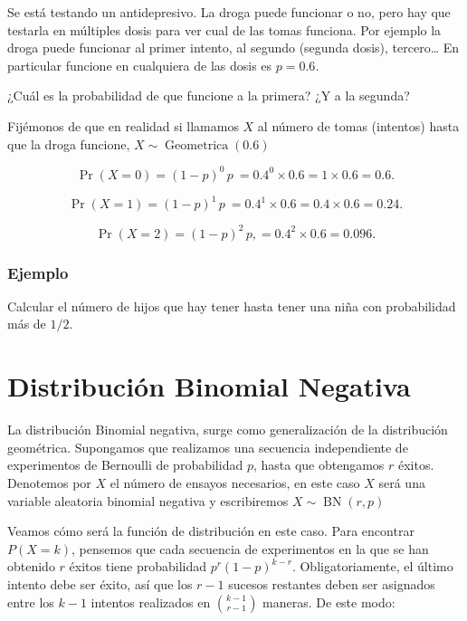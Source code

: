 \documentclass[]{book}
\theoremstyle{plain}
\theoremstyle{definition}
\theoremstyle{definition} %
\begin{document}
Se está testando un antidepresivo. La droga puede funcionar o no, pero
hay que testarla en múltiples dosis para ver cual de las tomas funciona.
Por ejemplo la droga puede funcionar al primer intento, al segundo
(segunda dosis), tercero\ldots{} En particular funcione en cualquiera de
las dosis es \(p=0.6\).

¿Cuál es la probabilidad de que funcione a la primera? ¿Y a la segunda?

Fijémonos de que en realidad si llamamos \(X\) al número de tomas
(intentos) hasta que la droga funcione,
\(\displaystyle X\sim \operatorname {Geometrica} (0.6)\)

\[\displaystyle \Pr(X=0)=(1-p)^{0}\,p\ =0.4^{0}\times 0.6=1\times 0.6=0.6.\]

\[\displaystyle \Pr(X=1)=(1-p)^{1}\,p\ =0.4^{1}\times 0.6=0.4\times 0.6=0.24.\]

\[\displaystyle \Pr(X=2)=(1-p)^{2}\,p,=0.4^{2}\times 0.6=0.096.\]

\hypertarget{ejemplo-3}{%
\subsubsection{Ejemplo}\label{ejemplo-3}}

Calcular el número de hijos que hay tener hasta tener una niña con
probabilidad más de \(1/2\).

\hypertarget{distribuciuxf3n-binomial-negativa}{%
\section{Distribución Binomial
Negativa}\label{distribuciuxf3n-binomial-negativa}}

La distribución Binomial negativa, surge como generalización de la
distribución geométrica. Supongamos que realizamos una secuencia
independiente de experimentos de Bernoulli de probabilidad \(p\), hasta
que obtengamos \(r\) éxitos. Denotemos por \(X\) el número de ensayos
necesarios, en este caso \(X\) será una variable aleatoria binomial
negativa y escribiremos \(\displaystyle X\sim \operatorname {BN} (r,p)\)

Veamos cómo será la función de distribución en este caso. Para encontrar
\(P(X=k)\), pensemos que cada secuencia de experimentos en la que se han
obtenido \(r\) éxitos tiene probabilidad \(p^r(1-p)^{k-r}\).
Obligatoriamente, el último intento debe ser éxito, así que los \(r-1\)
sucesos restantes deben ser asignados entre los \(k-1\) intentos
realizados en \({k-1 \choose r-1}\) maneras. De este modo:
\end{document}
